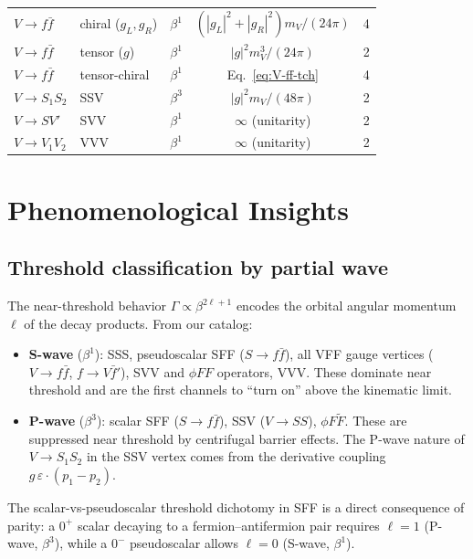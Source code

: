 \documentclass[11pt,a4paper]{article}
\begin{document}
\begin{longtable}{lllcl}
$V\to f\bar{f}$ & chiral ($g_L,g_R$) & $\beta^1$ & $(|g_L|^2+|g_R|^2) m_V/(24\pi)$ & 4 \\
$V\to f\bar{f}$ & tensor ($g$) & $\beta^1$ & $|g|^2 m_V^3/(24\pi)$ & 2 \\
$V\to f\bar{f}$ & tensor-chiral & $\beta^1$ & Eq.~\eqref{eq:V-ff-tch} & 4 \\
$V\to S_1S_2$ & SSV & $\beta^3$ & $|g|^2 m_V/(48\pi)$ & 2 \\
$V\to SV'$ & SVV & $\beta^1$ & $\infty$ (unitarity) & 2 \\
$V\to V_1V_2$ & VVV & $\beta^1$ & $\infty$ (unitarity) & 2 \\
\end{longtable}


\section{Phenomenological Insights}
\label{sec:pheno}

\subsection{Threshold classification by partial wave}

The near-threshold behavior $\Gamma \propto \beta^{2\ell+1}$ encodes the orbital angular
momentum $\ell$ of the decay products. From our catalog:

\begin{itemize}
\item \textbf{S-wave} ($\beta^1$): SSS, pseudoscalar SFF ($S\to f\bar{f}$), all VFF gauge vertices
  ($V\to f\bar{f}$, $f\to V\bar{f}'$), SVV and $\phi FF$ operators, VVV.
  These dominate near threshold and are the first channels to ``turn on'' above the kinematic limit.

\item \textbf{P-wave} ($\beta^3$): scalar SFF ($S\to f\bar{f}$), SSV ($V\to SS$),
  $\phi F\tilde{F}$. These are suppressed near threshold by centrifugal barrier effects.
  The P-wave nature of $V\to S_1 S_2$ in the SSV vertex comes from the derivative coupling
  $g\,\varepsilon\cdot(p_1-p_2)$.
\end{itemize}

The scalar-vs-pseudoscalar threshold dichotomy in SFF is a direct consequence of parity:
a $0^+$ scalar decaying to a fermion--antifermion pair requires $\ell=1$ (P-wave, $\beta^3$),
while a $0^-$ pseudoscalar allows $\ell=0$ (S-wave, $\beta^1$).
\end{document}
